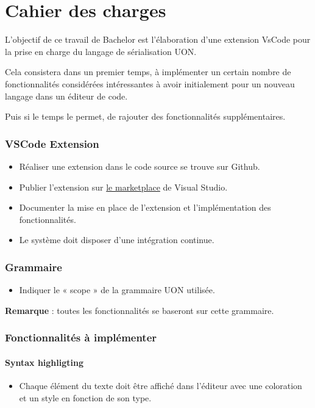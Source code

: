 \documentclass[
    iict, %
    il, %
]{heig-tb}
\begin{document}
\let\cleardoublepage\clearpage

\chapter{Cahier des charges}

L'objectif de ce travail de Bachelor est l'élaboration d'une extension VsCode pour la prise en charge du langage de sérialisation UON.

Cela consistera dans un premier temps, à implémenter un certain nombre de fonctionnalités considérées intéressantes à avoir initialement pour un nouveau langage dans un éditeur de code.

Puis si le temps le permet, de rajouter des fonctionnalités supplémentaires.

\subsection*{VSCode Extension}
\begin{itemize}
    \item Réaliser une extension dans le code source se trouve sur Github.
    \item Publier l’extension sur \href{https://marketplace.visualstudio.com/}{le marketplace} de Visual Studio.
    \item Documenter la mise en place de l’extension et l’implémentation des fonctionnalités.
    \item Le système doit disposer d’une intégration continue.
\end{itemize}

\subsection*{Grammaire}
\begin{itemize}
    \item Indiquer le « scope » de la grammaire UON utilisée.
\end{itemize}
\textbf{Remarque} : toutes les fonctionnalités se baseront sur cette grammaire.

\subsection*{Fonctionnalités à implémenter}
\subsubsection*{Syntax highligting}
\begin{itemize}
    \item Chaque élément du texte doit être affiché dans l’éditeur avec une coloration et un style en fonction de son type.
\end{itemize}
\end{document}
